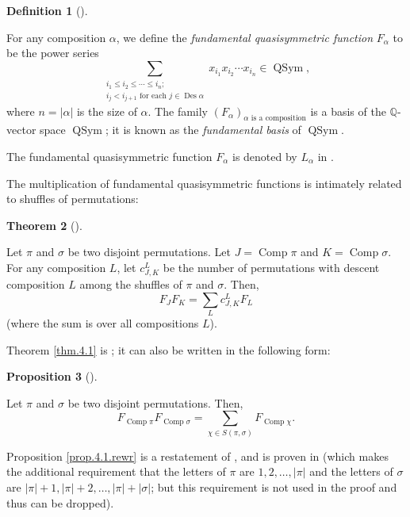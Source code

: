 \documentclass[numbers=enddot,12pt,final,onecolumn,notitlepage]{scrartcl}%
\theoremstyle{definition}
\newtheorem{theo}{Theorem}[section]
\newenvironment{theorem}[1][]
{\begin{theo}[#1]\begin{leftbar}}
{\end{leftbar}\end{theo}}
\newtheorem{prop}[theo]{Proposition}
\newenvironment{proposition}[1][]
{\begin{prop}[#1]\begin{leftbar}}
{\end{leftbar}\end{prop}}
\newtheorem{defi}[theo]{Definition}
\newenvironment{definition}[1][]
{\begin{defi}[#1]\begin{leftbar}}
{\end{leftbar}\end{defi}}
\newenvironment{verlong}{}{}
\newenvironment{vershort}{}{}
\let\sumnonlimits\sum
\renewcommand{\sum}{\sumnonlimits\limits}
\begin{document}
\begin{definition}
For any composition $\alpha$, we define the \textit{fundamental quasisymmetric
function} $F_{\alpha}$ to be the power series%
\[
\sum_{\substack{i_{1}\leq i_{2}\leq\cdots\leq i_{n};\\i_{j}<i_{j+1}\text{ for
each }j\in\operatorname{Des}\alpha}}x_{i_{1}}x_{i_{2}}\cdots x_{i_{n}}%
\in\operatorname*{QSym},
\]
where $n=\left\vert \alpha\right\vert $ is the size of $\alpha$. The family
$\left(  F_{\alpha}\right)  _{\alpha\text{ is a composition}}$ is a basis of
the $\mathbb{Q}$-vector space $\operatorname*{QSym}$; it is known as the
\textit{fundamental basis} of $\operatorname*{QSym}$.
\end{definition}

The fundamental quasisymmetric function $F_{\alpha}$ is denoted
by $L_{\alpha}$ in \cite[\S 5.2]{HopfComb}.

The multiplication of fundamental quasisymmetric functions is intimately
related to shuffles of permutations:

\begin{verlong}
\begin{theorem}
\label{thm.4.1}Let $\pi$ and $\sigma$ be two disjoint permutations. Let
$J=\operatorname*{Comp}\pi$ and $K=\operatorname*{Comp}\sigma$. For any
composition $L$, let $c_{J,K}^{L}$ be the number of permutations with descent
composition $L$ among the shuffles of $\pi$ and $\sigma$. Then,%
\[
F_{J}F_{K}=\sum_{L}c_{J,K}^{L}F_{L}%
\]
(where the sum is over all compositions $L$).
\end{theorem}

Theorem \ref{thm.4.1} is \cite[Theorem 4.1]{part1}; it can also be written in
the following form:
\end{verlong}

\begin{proposition}
\label{prop.4.1.rewr}Let $\pi$ and $\sigma$ be two disjoint permutations.
Then,%
\[
F_{\operatorname*{Comp}\pi}F_{\operatorname*{Comp}\sigma}=\sum_{\chi\in
S\left(  \pi,\sigma\right)  }F_{\operatorname*{Comp}\chi}.
\]

\end{proposition}

\begin{vershort}
Proposition \ref{prop.4.1.rewr} is a restatement of \cite[Theorem 4.1]{part1},
and is proven in \cite[(5.2.6)]{HopfComb} (which makes the additional
requirement that the letters of $\pi$ are $1,2,\ldots,\left\vert
\pi\right\vert $ and the letters of $\sigma$ are $\left\vert \pi\right\vert
+1,\left\vert \pi\right\vert +2,\ldots,\left\vert \pi\right\vert +\left\vert
\sigma\right\vert $; but this requirement is not used in the proof and thus
can be dropped).
\end{vershort}
\end{document}
